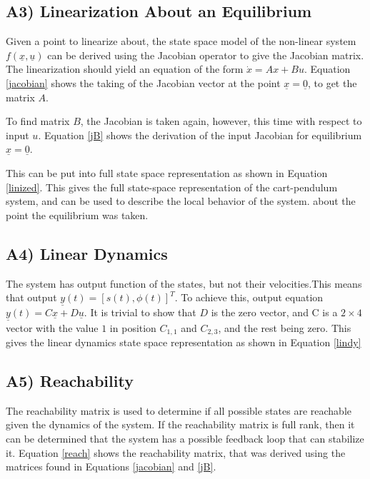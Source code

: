 \documentclass{article}
\begin{document}
\subsection*{A3) Linearization About an Equilibrium}
Given a point to linearize about, the state space model of the non-linear system $f(\underline{x},\underline{u})$ can be derived using the Jacobian operator to give the Jacobian matrix. The linearization should yield an equation of the form $\dot x = Ax+Bu$. Equation \ref{jacobian} shows the taking of the Jacobian vector at the point $\underline{x}=\underline{0}$, to get the matrix $A$.



To find matrix $B$, the Jacobian is taken again, however, this time with respect to input $u$. Equation \ref{jB} shows the derivation of the input Jacobian for equilibrium $\underline{x}=\underline{0}$.




This can be put into full state space representation as shown in Equation \ref{linized}. This gives the full state-space representation of the cart-pendulum system, and can be used to describe the local behavior of the system. about the point the equilibrium was taken.


\subsection*{A4) Linear Dynamics}
The system has output function of the states, but not their velocities.This means that output $\underline{y}(t)=[s(t), \phi(t)]^T$. To achieve this, output equation $\underline{y}(t)=C\underline{x}+D\underline{u}$. It is trivial to show that $D$ is the zero vector, and C is a $2\times4$ vector with  the value $1$ in position $C_{1,1}$ and $C_{2,3}$, and the rest being zero. This gives the linear dynamics state space representation as shown in Equation \ref{lindy}



\subsection*{A5) Reachability}
The reachability matrix is used to determine if all possible states are reachable given the dynamics of the system. If the reachability matrix is full rank, then it can be determined that the system has a possible feedback loop that can stabilize it. Equation \ref{reach} shows the reachability matrix, that was derived using the matrices found in Equations \ref{jacobian} and \ref{jB}.
\end{document}
